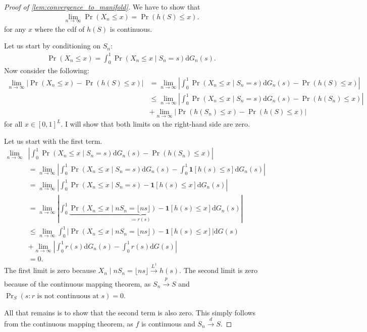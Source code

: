 \documentclass[a4paper]{article}
\begin{document}
\begin{proof}[Proof of \cref{lem:convergence_to_manifold}]
    We have to show that
    \begin{align*}
        \lim_{n \to \infty} \Pr(X_n \leq x) = \Pr(h(S) \leq x).
    \end{align*}
    for any $x$ where the cdf of $h(S)$ is continuous.

    Let us start by conditioning on $S_n$:
    \begin{align*}
        \Pr(X_n \leq x) = \int_0^1 \Pr(X_n \leq x \mid S_n = s) \mathrm{d}G_n(s).
    \end{align*}
    Now consider the following:
    \begin{align*}
        \lim_{n \to \infty} \left| \Pr(X_n \leq x) - \Pr(h(S) \leq x) \right| &= \lim_{n \to \infty} \left| \int_0^1 \Pr(X_n \leq x \mid S_n = s) \mathrm{d}G_n(s) - \Pr(h(S) \leq x) \right| \\
        &\leq \lim_{n \to \infty} \left| \int_0^1 \Pr(X_n \leq x \mid S_n = s) \mathrm{d}G_n(s) - \Pr(h(S_n) \leq x) \right| \\
        &+ \lim_{n \to \infty} \left| \Pr(h(S_n) \leq x) - \Pr(h(S) \leq x) \right|
    \end{align*}
    for all $x \in [0, 1]^L$.
    I will show that both limits on the right-hand side are zero.

    Let us start with the first term.
    \begin{align*}
        \lim_{n \to \infty} &\left| \int_0^1 \Pr(X_n \leq x \mid S_n = s) \mathrm{d}G_n(s) - \Pr(h(S_n) \leq x) \right| \\
        &= \lim_{n \to \infty} \left| \int_0^1 \Pr(X_n \leq x \mid S_n = s) \mathrm{d}G_n(s) - \int_0^1 \mathbf{1}[h(s) \leq s] \mathrm{d}G_n(s) \right| \\
        &= \lim_{n \to \infty} \left| \int_0^1 \Pr(X_n \leq x \mid S_n = s) - \mathbf{1}[h(s) \leq x] \mathrm{d}G_n(s) \right| \\
        &= \lim_{n \to \infty} \left| \int_0^1 \underbrace{\Pr(X_n \leq x \mid nS_n = \lfloor ns \rfloor) - \mathbf{1}[h(s) \leq x]}_{\coloneqq r(s)} \mathrm{d}G_n(s) \right| \\
        &\leq \lim_{n \to \infty} \int_0^1 \left| \Pr(X_n \leq x \mid nS_n = \lfloor ns \rfloor) - \mathbf{1}[h(s) \leq x] \right| \mathrm{d}G(s) \\
        &+ \lim_{n \to \infty} \left| \int_0^1 r(s) \mathrm{d}G_n(s) - \int_0^1 r(s) \mathrm{d}G(s) \right| \\
        &= 0.
    \end{align*}
    The first limit is zero because $X_n \mid n S_n = \lfloor ns \rfloor \xrightarrow[]{L^1} h(s)$.
    The second limit is zero because of the continuous mapping theorem, as $S_n \xrightarrow[]{p} S$ and $\Pr_S(s : r\text{ is not continuous at }s)= 0$.

    All that remains is to show that the second term is also zero.
    This simply follows from the continuous mapping theorem, as $f$ is continuous and $S_n \xrightarrow[]{d} S$.
\end{proof}
\end{document}
